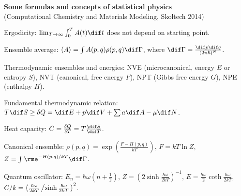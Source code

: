 \documentclass[11pt]{Aarticle}
\begin{document}
\begin{center}
\Large\textbf{Some formulas and concepts of statistical physics} \\ \smallskip
\small (Computational Chemistry and Materials Modeling, Skoltech 2014)
\end{center}

Ergodicity: $\lim_{T\to\infty}\int_{0}^{T}A(t)\dif t$ does not depend on starting point.

Ensemble average: $\langle A\rangle=\int A(p,q)\rho(p,q)\dif\Gamma$, where $\dif\Gamma=\frac{\dif p\dif q}{(2\pi\hbar)^N}$.

Thermodynamic ensembles and energies: NVE (microcanonical, energy $E$ or entropy $S$), NVT (canonical, free energy $F$), NPT (Gibbs free energy $G$), NPE (enthalpy $H$).

Fundamental thermodynamic relation: $T\dif S\geq\delta Q=\dif E+p\dif V+\sum a\dif A-\mu\dif N$.

Heat capacity: $C=\frac{\delta Q}{\delta T}=T\frac{\dif S}{\dif T}$.

Canonical ensemble: $\rho(p,q)=\exp\left(\frac{F-H(p,q)}{kT}\right)$, $F=kT\ln Z$, $Z=\int\rme^{-H(p,q)/kT}\dif\Gamma$.

Quantum oscillator: $E_n=\hbar\omega\left(n+\frac{1}{2}\right)$, $Z=\left(2\sinh\frac{\hbar\omega}{2kT}\right)^{-1}$, $E=\frac{\hbar\omega}{2}\coth\frac{\hbar\omega}{2kT}$, $C/k=\left(\frac{\hbar\omega}{2kT}\left/\sinh\frac{\hbar\omega}{2kT}\right.\right)^2$.
\end{document}
